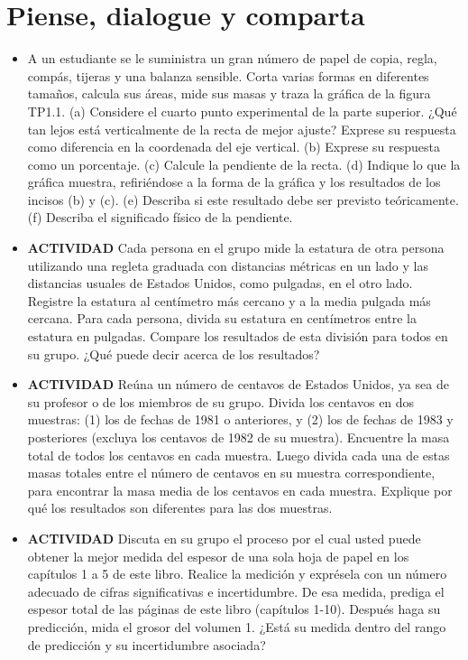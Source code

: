 \documentclass[11pt,a4paper]{article}
\begin{document}
\section*{Piense, dialogue y comparta}

\begin{itemize}
    \item[\textbf{1.}] A un estudiante se le suministra un gran número de papel de copia, regla, compás, tijeras y una balanza sensible. Corta varias formas en diferentes tamaños, calcula sus áreas, mide sus masas y traza la gráfica de la figura TP1.1. (a) Considere el cuarto punto experimental de la parte superior. ¿Qué tan lejos está verticalmente de la recta de mejor ajuste? Exprese su respuesta como diferencia en la coordenada del eje vertical. (b) Exprese su respuesta como un porcentaje. (c) Calcule la pendiente de la recta. (d) Indique lo que la gráfica muestra, refiriéndose a la forma de la gráfica y los resultados de los incisos (b) y (c). (e) Describa si este resultado debe ser previsto teóricamente. (f) Describa el significado físico de la pendiente.
    \vspace*{12cm}
    
    \item[\textbf{2.}] \textbf{ACTIVIDAD} Cada persona en el grupo mide la estatura de otra persona utilizando una regleta graduada con distancias métricas en un lado y las distancias usuales de Estados Unidos, como pulgadas, en el otro lado. Registre la estatura al centímetro más cercano y a la media pulgada más cercana. Para cada persona, divida su estatura en centímetros entre la estatura en pulgadas. Compare los resultados de esta división para todos en su grupo. ¿Qué puede decir acerca de los resultados?
    \vspace*{6cm}
    
    \item[\textbf{3.}] \textbf{ACTIVIDAD} Reúna un número de centavos de Estados Unidos, ya sea de su profesor o de los miembros de su grupo. Divida los centavos en dos muestras: (1) los de fechas de 1981 o anteriores, y (2) los de fechas de 1983 y posteriores (excluya los centavos de 1982 de su muestra). Encuentre la masa total de todos los centavos en cada muestra. Luego divida cada una de estas masas totales entre el número de centavos en su muestra correspondiente, para encontrar la masa media de los centavos en cada muestra. Explique por qué los resultados son diferentes para las dos muestras.
    \vspace*{6cm}
    
    \item[\textbf{4.}] \textbf{ACTIVIDAD} Discuta en su grupo el proceso por el cual usted puede obtener la mejor medida del espesor de una sola hoja de papel en los capítulos 1 a 5 de este libro. Realice la medición y exprésela con un número adecuado de cifras significativas e incertidumbre. De esa medida, prediga el espesor total de las páginas de este libro (capítulos 1-10). Después haga su predicción, mida el grosor del volumen 1. ¿Está su medida dentro del rango de predicción y su incertidumbre asociada?
    \vspace*{6cm}
\end{itemize}
\end{document}
